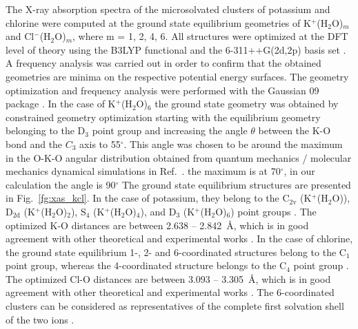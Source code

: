 \documentclass[journal=jacsat,manuscript=suppinfo]{achemso}
\newcommand{\cli}{Cl$^{-}$}
\begin{document}
The X-ray absorption spectra of the microsolvated clusters of potassium and chlorine were computed at the ground state equilibrium geometries of K$^+$(H$_2$O)$_m$ and \cli(H$_2$O)$_m$, where m = 1, 2, 4, 6. All structures were optimized at the DFT level of theory using the B3LYP functional and the 6-311++G(2d,2p) basis set \citep{Krishnan80:650,Blaudeau97:5016}. A frequency analysis was carried out in order to confirm that the obtained geometries are minima on the respective potential energy surfaces. The geometry optimization and frequency analysis were performed with the Gaussian 09 package \citep{g09}. In the case of K$^{+}$(H$_2$O)$_6$ the ground state geometry was obtained by constrained geometry optimization starting with the equilibrium geometry \citep{lee99:3995} belonging to the D$_3$ point group and increasing the angle $\theta$ between the K-O bond and the $C_3$ axis to 55$^{\circ}$. This angle was chosen to be around the maximum in the O-K-O angular distribution obtained from quantum mechanics / molecular mechanics dynamical simulations in Ref.\ \citep{ma14:1006}. {\color{red} the maximum is at 70$^{\circ}$, in our calculation the angle is 90$^{\circ}$} The ground state equilibrium structures are presented in Fig.\ \ref{fg:xas_kcl}. In the case of potassium, they belong to the C$_{2\text{v}}$ (K$^{+}$(H$_2$O)), D$_{2\text{d}}$ (K$^{+}$(H$_2$O)$_2$), S$_4$ (K$^{+}$(H$_2$O)$_4$), and D$_3$ (K$^{+}$(H$_2$O)$_6$) point groups \citep{rao08:12944}. The optimized K-O distances are between 2.638 -- 2.842~\AA, which is in good agreement with other theoretical and experimental works \citep{Ohtaki93:1157,soper06:180,ma14:1006}. In the case of chlorine, the ground state equilibrium 1-, 2- and 6-coordinated structures belong to the C$_{1}$ point group, whereas the 4-coordinated structure belongs to the C$_4$ point group \citep{gora00:7}. The optimized Cl-O distances are between 3.093 -- {\color{red}3.305}~\AA, which is in good agreement with other theoretical and experimental works \citep{ge13:13169,gora00:7,Ohtaki93:1157,soper06:180,ma14:1006}. The 6-coordinated clusters can be considered as representatives of the complete first solvation shell of the two ions \citep{Ohtaki93:1157,soper06:180,ma14:1006}.
\end{document}
